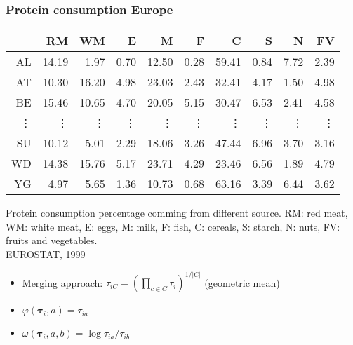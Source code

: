 \begin{frame}[t, label=first-aliments]
\frametitle{Protein consumption Europe }
\scriptsize
\begin{table}[ht]
\begin{center}
\begin{tabular}{rrrrrrrrrr}
  \hline
 & RM & WM & E & M & F & C & S & N & FV \\
  \hline
AL & 14.19 & 1.97 & 0.70 & 12.50 & 0.28 & 59.41 & 0.84 & 7.72 & 2.39 \\
  AT & 10.30 & 16.20 & 4.98 & 23.03 & 2.43 & 32.41 & 4.17 & 1.50 & 4.98 \\
  BE & 15.46 & 10.65 & 4.70 & 20.05 & 5.15 & 30.47 & 6.53 & 2.41 & 4.58 \\
\vdots&\vdots&\vdots&\vdots&\vdots&\vdots&\vdots&\vdots&\vdots&\vdots\\
  SU & 10.12 & 5.01 & 2.29 & 18.06 & 3.26 & 47.44 & 6.96 & 3.70 & 3.16 \\
  WD & 14.38 & 15.76 & 5.17 & 23.71 & 4.29 & 23.46 & 6.56 & 1.89 & 4.79 \\
  YG & 4.97 & 5.65 & 1.36 & 10.73 & 0.68 & 63.16 & 3.39 & 6.44 & 3.62 \\
   \hline
\end{tabular}
\end{center}
\end{table}
\tiny Protein consumption percentage comming from different source.
RM: red meat, WM: white meat, E: eggs, M: milk, F: fish, C: cereals, S: starch, N: nuts, FV: fruits and vegetables. \\EUROSTAT, 1999

\medskip
\small
\begin{itemize}
\item Merging approach: $\tau_{iC} = \left( \prod_{c \in C} \tau_{i} \right)^{1/|C|}$ (geometric mean)
\item $\varphi(\boldsymbol\tau_i, a) = \tau_{ia}$
\item $\omega(\boldsymbol\tau_i, a, b) = \log \tau_{ia}/\tau_{ib}$
\end{itemize}
\hyperlink{last-aliments<1>}{}
\end{frame}

